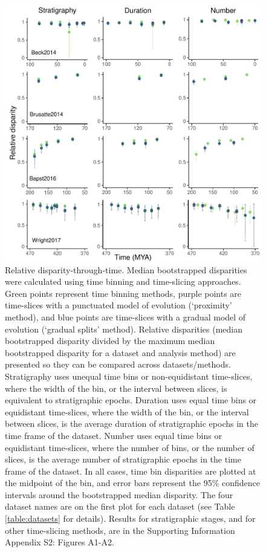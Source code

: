 \documentclass[12pt,a4paper]{article}
\begin{document}
\begin{figure}[!htbp]
    \centering
    \includegraphics[width=1\linewidth, height=1\textheight, keepaspectratio]{figures/Figure2-fig-dtt-epoch-revision.pdf}
    \caption[Relative disparity-through-time.]
    {Relative disparity-through-time. Median bootstrapped disparities were calculated using time binning and time-slicing approaches. 
    Green points represent time binning methods, purple points are time-slices with a punctuated model of evolution (`proximity' method), and blue points are time-slices with a gradual model of evolution (`gradual splits' method).
    Relative disparities (median bootstrapped disparity divided by the maximum median bootstrapped disparity for a dataset and analysis method) are presented so they can be compared across datasets/methods. 
    Stratigraphy uses unequal time bins or non-equidistant time-slices, where the width of the bin, or the interval between slices, is equivalent to stratigraphic epochs. 
    Duration uses equal time bins or equidistant time-slices, where the width of the bin, or the interval between slices, is the average duration of stratigraphic epochs in the time frame of the dataset. 
    Number uses equal time bins or equidistant time-slices, where the number of bins, or the number of slices, is the average number of stratigraphic epochs in the time frame of the dataset. 
    In all cases, time bin disparities are plotted at the midpoint of the bin, and error bars represent the 95\% confidence intervals around the bootstrapped median disparity.
    The four dataset names are on the first plot for each dataset (see Table \ref{table:datasets} for details).
    Results for stratigraphic stages, and for other time-slicing methods, are in the Supporting Information Appendix S2: Figures A1-A2.}
    \label{figure:dtt1}
\end{figure}
\end{document}
